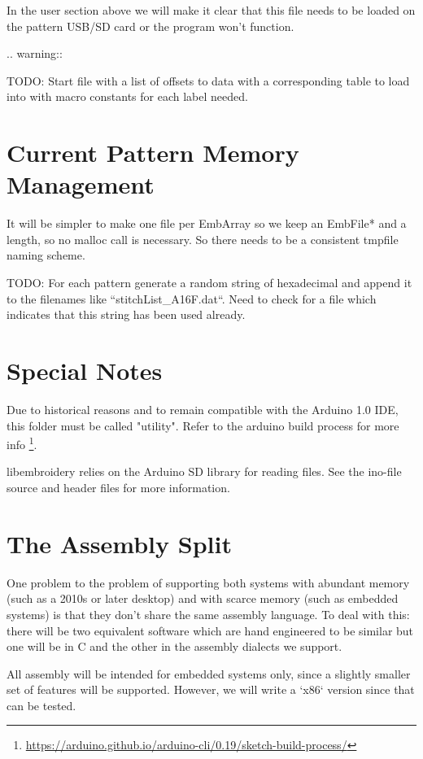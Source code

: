 \documentclass[a4paper]{report}
\begin{document}
In the user section above we will make it clear that this file
needs to be loaded on the pattern USB/SD card or the program won't function.

.. warning::

   TODO: Start file with a list of offsets to data with a corresponding table
   to load into with macro constants for each label needed.

\section{Current Pattern Memory Management}

It will be simpler to make one file per EmbArray so we keep an EmbFile*
and a length, so no malloc call is necessary. So there needs to be a consistent
tmpfile naming scheme.

TODO: For each pattern generate a random string of hexadecimal and append it
to the filenames like ``stitchList\_A16F.dat``. Need to check for a file
which indicates that this string has been used already.

\section{Special Notes}

Due to historical reasons and to remain compatible with the Arduino 1.0
IDE, this folder must be called "utility". Refer to the arduino build
process for more info
\footnote{\url{https://arduino.github.io/arduino-cli/0.19/sketch-build-process/}}.

libembroidery relies on the Arduino SD library for reading files. See
the ino-file source and header files for more information.

\section{The Assembly Split}

One problem to the problem of supporting both systems with abundant memory
(such as a 2010s or later desktop) and with scarce memory (such as embedded
systems) is that they don't share the same assembly language. To deal with
this: there will be two equivalent software which are hand engineered to be
similar but one will be in C and the other in the assembly dialects we support.

All assembly will be intended for embedded systems only, since a slightly
smaller set of features will be supported. However, we will write a
`x86` version since that can be tested.
\end{document}
